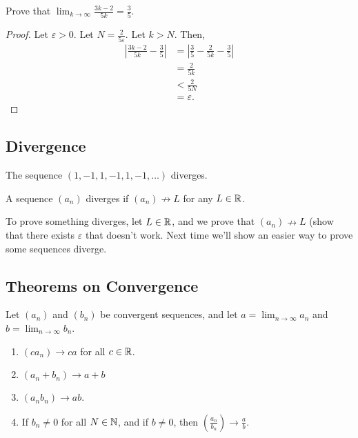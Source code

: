 \begin{example}
Prove that $\lim_{k \to \infty} \frac{3k-2}{5k} = \frac 3 5$.
\end{example}

\begin{proof}
Let $\varepsilon > 0$. Let $N = \frac 2 {5\varepsilon}$. Let $k > N$. Then,
\begin{align*}
    \left|\frac{3k-2}{5k} - \frac 3 5 \right| &= \left|\frac 3 5 - \frac 2 {5k} - \frac 3 5\right| \\
    &= \frac{2}{5k} \\
    &< \frac{2}{5N} \\
    &= \varepsilon.
\end{align*}
\end{proof}

\subsection{Divergence}

\begin{example}
The sequence $(1, -1, 1, -1, 1, -1, \dots)$ diverges.
\end{example}

\begin{definition}[Divergence]
A sequence $(a_n)$ diverges if $(a_n) \nrightarrow L $  for any $L \in \mathbb{R}$.
\end{definition}

To prove something diverges, let $L \in \mathbb{R}$, and we prove that $(a_n) \nrightarrow L$ (show that there exists $\varepsilon$ that doesn't work. Next time we'll show an easier way to prove some sequences diverge.

\subsection{Theorems on Convergence}

\begin{theorem}
Let $(a_n)$ and $(b_n)$ be convergent sequences, and let $a = \lim_{n \to \infty} a_n$ and $b = \lim_{n \to \infty} b_n$.
\begin{enumerate}
    \item $(ca_n) \to ca$ for all $c \in \mathbb{R}$.
    \item $(a_n+b_n) \to a+b$  
    \item $(a_nb_n) \to ab$.
    \item If $b_n \neq 0$ for all $N \in \mathbb{N}$, and if $b \neq 0$, then $\left(\frac{a_n}{b_n}\right) \to \frac a b$.
\end{enumerate}
\end{theorem}

